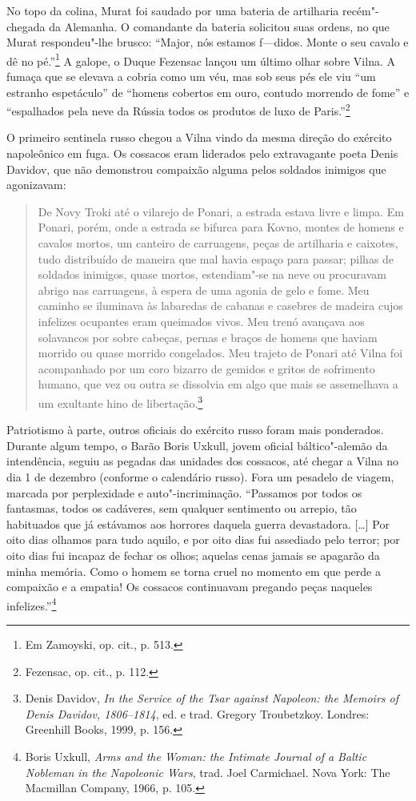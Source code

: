 No topo da colina, Murat foi saudado por uma bateria de artilharia
recém"-chegada da Alemanha. O comandante da bateria solicitou suas
ordens, no que Murat respondeu"-lhe brusco: ``Major, nós estamos
f---didos. Monte o seu cavalo e dê no pé.''\footnote{Em Zamoyski, op. cit., p. 513.} A galope, o Duque Fezensac lançou um último olhar sobre Vilna. A fumaça que se elevava a cobria como um véu, mas sob seus
pés ele viu ``um estranho espetáculo'' de ``homens cobertos em ouro,
contudo morrendo de fome'' e ``espalhados pela neve da Rússia todos os
produtos de luxo de Paris.''\footnote{Fezensac, op. cit., p. 112.}

\asterisc

O primeiro sentinela russo chegou a Vilna vindo da mesma direção do
exército napoleônico em fuga. Os cossacos eram liderados pelo
extravagante poeta Denis Davidov, que não demonstrou compaixão alguma
pelos soldados inimigos que agonizavam:

\begin{quote}
De Novy Troki até o vilarejo de Ponari, a estrada estava livre e limpa.
Em Ponari, porém, onde a estrada se bifurca para Kovno, montes de homens
e cavalos mortos, um canteiro de carruagens, peças de artilharia e
caixotes, tudo distribuído de maneira que mal havia espaço para passar;
pilhas de soldados inimigos, quase mortos, estendiam"-se na neve ou
procuravam abrigo nas carruagens, à espera de uma agonia de gelo e fome.
Meu caminho se iluminava às labaredas de cabanas e casebres de madeira
cujos infelizes ocupantes eram queimados vivos. Meu trenó avançava aos
solavancos por sobre cabeças, pernas e braços de homens que haviam
morrido ou quase morrido congelados. Meu trajeto de Ponari até Vilna foi
acompanhado por um coro bizarro de gemidos e gritos de sofrimento
humano, que vez ou outra se dissolvia em algo que mais se assemelhava a
um exultante hino de libertação.\footnote{Denis Davidov, \textit{In the Service of the Tsar against Napoleon: the Memoirs of Denis Davidov, 1806--1814}, ed. e trad. Gregory Troubetzkoy. Londres: Greenhill Books, 1999, p. 156.} 
\end{quote}

Patriotismo à parte, outros oficiais do exército russo foram mais
ponderados. Durante algum tempo, o Barão Boris Uxkull, jovem oficial
báltico"-alemão da intendência, seguiu as pegadas das unidades dos
cossacos, até chegar a Vilna no dia 1 de dezembro (conforme o calendário
russo). Fora um pesadelo de viagem, marcada por perplexidade e
auto"-incriminação. ``Passamos por todos os fantasmas, todos os
cadáveres, sem qualquer sentimento ou arrepio, tão habituados que já
estávamos aos horrores daquela guerra devastadora. [\ldots{}] Por oito
dias olhamos para tudo aquilo, e por oito dias fui assediado pelo
terror; por oito dias fui incapaz de fechar os olhos; aquelas cenas
jamais se apagarão da minha memória. Como o homem se torna cruel no
momento em que perde a compaixão e a empatia! Os cossacos continuavam
pregando peças naqueles infelizes.''\footnote{Boris Uxkull, \textit{Arms and the Woman: the Intimate Journal of a Baltic Nobleman in the Napoleonic Wars}, trad. Joel Carmichael. Nova York: The Macmillan Company, 1966, p. 105.}

